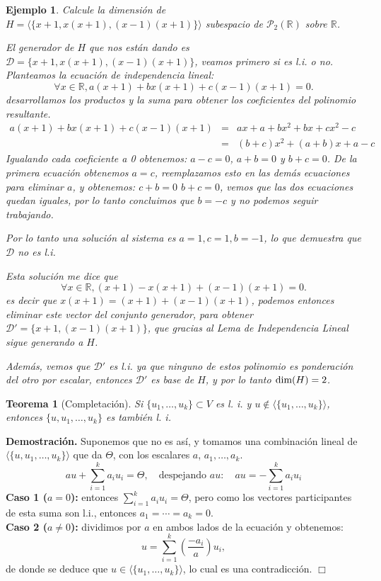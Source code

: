 \documentclass[12pt]{book}
\newtheorem{teo}{Teorema}
\newtheorem{ejem}{Ejemplo}
\def\R{\mathbb{R}}
\def\P{\mathcal{P}}
\def\D{\mathcal{D}}
\def\dim{\textup{dim}}
\begin{document}
\begin{ejem}
Calcule la dimensión de $H=\langle\{x+1,x(x+1),(x-1)(x+1)\}\rangle$ subespacio de $\P_2(\R)$ sobre $\R$.

{\em
  El generador de $H$ que nos están dando es $\D=\{x+1,x(x+1),(x-1)(x+1)\}$, veamos primero si es l.i. o no.
  Planteamos la ecuación de independencia lineal:
  $$\forall x\in\R, a(x+1)+bx(x+1)+c(x-1)(x+1)=0.$$
desarrollamos los productos y la suma para obtener los coeficientes del polinomio resultante.
\begin{eqnarray*}
  a(x+1)+bx(x+1)+c(x-1)(x+1)&=&ax+a+bx^2+bx+cx^2-c\\
  &=&(b+c)x^2+(a+b)x+a-c
\end{eqnarray*}
Igualando cada coeficiente a 0 obtenemos: $a-c=0$, $a+b=0$ y $b+c=0$.
De la primera ecuación obtenemos $a=c$, reemplazamos esto en las demás ecuaciones para eliminar $a$, y obtenemos:
$c+b=0$ $b+c=0$, vemos que las dos ecuaciones quedan iguales, por lo tanto concluimos que $b=-c$ y no podemos seguir trabajando.

Por lo tanto una solución al sistema es $a=1, c=1, b=-1$, lo que demuestra que $\D$ no es l.i.

Esta solución me dice que 
  $$\forall x\in\R, (x+1)-x(x+1)+(x-1)(x+1)=0.$$
 es decir que $x(x+1)=(x+1)+(x-1)(x+1)$, podemos entonces eliminar este vector del conjunto generador, para obtener $\D'=\{x+1,(x-1)(x+1)\}$, que gracias al Lema de Independencia Lineal sigue generando a $H$.

Además, vemos que $\D'$ es l.i. ya que ninguno de estos polinomio es ponderación del otro por escalar, entonces $\D'$ es base de $H$, y por lo tanto $\dim(H)=2$.
}
\end{ejem}


\begin{teo}[Completación]\label{teo:crece}
Si $\{u_1,\dots,u_k\}\subset V$ es l. i. y  $u\not\in\langle\{u_1,\dots,u_k\}\rangle$, entonces $\{u,u_1,\dots,u_k\}$ es también l. i.
\end{teo}
{\bf Demostración.} {
  Suponemos que no es así, y tomamos una combinación lineal de $\langle\{u, u_1,\dots,u_k\}\rangle$ que da $\Theta$, con los escalares $a$, $a_1,\dots,a_k$.
  $$au+\sum_{i=1}^k a_i u_i=\Theta, \quad \textrm{despejando }au:\quad au=-\sum_{i=1}^k a_i u_i$$
  {\bf Caso 1 ($a=0$):} entonces $\sum_{i=1}^k a_i u_i=\Theta $, pero como los vectores participantes de esta suma son l.i., entonces $a_1=\cdots =a_k=0$.\\
  {\bf Caso 2 ($a\not=0$):} dividimos por $a$ en ambos lados de la ecuación y obtenemos:
  $$u=\sum_{i=1}^k\left(\frac{-a_i}{a}\right) u_i,$$
  de donde se deduce que $u\in\langle\{u_1,\dots,u_k\}\rangle$, lo cual es una contradicción.
  \hfill $\Box$
}
\end{document}
